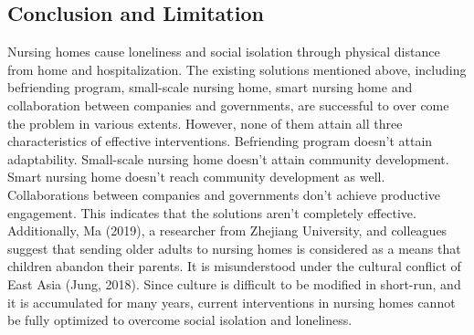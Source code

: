 \documentclass[12pt]{article}
\begin{document}
\subsection{Conclusion and Limitation}

Nursing homes cause loneliness and social isolation through physical distance from home and hospitalization. The existing solutions mentioned above, including befriending program, small-scale nursing home, smart nursing home and collaboration between companies and governments, are successful to over come the problem in various extents. However, none of them attain all three characteristics of effective interventions. Befriending program doesn’t attain adaptability. Small-scale nursing home doesn’t attain community development. Smart nursing home doesn’t reach community development as well. Collaborations between companies and governments don’t achieve productive engagement. This indicates that the solutions aren’t completely effective. Additionally, Ma (2019), a researcher from Zhejiang University, and colleagues suggest that sending older adults to nursing homes is considered as a means that children abandon their parents. It is misunderstood under the cultural conflict of East Asia (Jung, 2018). Since culture is difficult to be modified in short-run, and it is accumulated for many years, current interventions in nursing homes cannot be fully optimized to overcome social isolation and loneliness.

\end{document}

